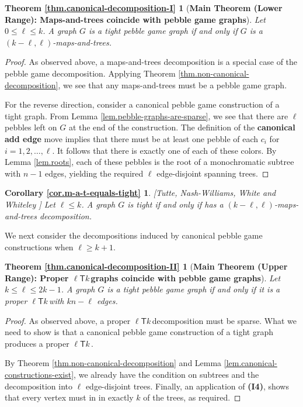 \documentclass[11pt]{article}
\newcommand{\ellteekay}{\ensuremath{\ell{\mathsf T}k}\,}
\newcommand{\reflem}[1]{Lemma \ref{lem.#1}}
\newcommand{\refthm}[1]{Theorem \ref{thm.#1}}
\newcommand{\refcor}[1]{Corollary \ref{cor.#1}}
\newcommand{\restateenv}{ZZZ}
\newenvironment{restate}[1]{
  \renewcommand{\restateenv}{restate.#1}
  \newtheorem*{\restateenv}{\refthm{#1}}
  \begin{\restateenv}
}{\end{\restateenv}}
\newenvironment{restatecor}[1]{
  \renewcommand{\restateenv}{restate.#1}
  \newtheorem*{\restateenv}{\refcor{#1}}
  \begin{\restateenv}
}{\end{\restateenv}}
\begin{document}
	\begin{restate}{canonical-decomposition-I}[{\bf Main Theorem (Lower Range): Maps-and-trees coincide with pebble game graphs}]
	Let $0\le \ell\le k$. A graph $G$ is a tight pebble game graph if and only if $G$ is a $(k-\ell,\ell)$-maps-and-trees.
	\end{restate}
	\begin{proof}
		As observed above, a maps-and-trees decomposition is a special case of the pebble 
		game decomposition.  Applying \refthm{non-canonical-decomposition}, we see that
		any maps-and-trees must be a pebble game graph.
		
		For the reverse direction, consider a canonical pebble game construction of a tight graph. 
		From \reflem{pebble-graphs-are-sparse}, we see that there are $\ell$ pebbles left on 
		$G$ at the end of the construction.
		The definition of the {\bf canonical add edge} move 
		implies that there must be at least one pebble of 
		each $c_i$ for $i=1,2,\ldots,\ell$.  It follows that there is exactly one of each of these 
		colors.  By \reflem{roots}, each of these pebbles is the root of a monochromatic subtree
		with $n-1$ edges, yielding the required $\ell$ edge-disjoint spanning trees.
	\end{proof}
	\begin{restatecor}{m-a-t-equals-tight}
		[Tutte, Nash-Williams, White and Whiteley \cite{tutte61,Na61,whiteley:matroids}] 
		Let $\ell\le k$. A graph $G$ is tight if and only if has a $(k-\ell,\ell)$-maps-and-trees decomposition.
	\end{restatecor}
	
	We next consider the decompositions induced by canonical pebble game 
	constructions when $\ell\ge k+1$. 
	\begin{restate}{canonical-decomposition-II}[{\bf Main Theorem (Upper Range): Proper \ellteekay graphs coincide with pebble game graphs}]
		Let $k\le \ell\le 2k-1$. A graph $G$ is a tight pebble game graph if and only if it is a proper \ellteekay with $kn-\ell$ edges. 
	\end{restate}
	\begin{proof}
		As observed above, a proper \ellteekay decomposition must be sparse.  
		What we need to show is that a canonical pebble game construction of a tight 
		graph produces a proper \ellteekay.
		
		By \refthm{non-canonical-decomposition} and \reflem{canonical-constructions-exist}, 
		we already have the condition on subtrees and the decomposition into $\ell$ edge-disjoint
		trees.  Finally, an application of {\bf (I4)}, shows that every vertex must in in 
		exactly $k$ of the trees, as required.
	\end{proof}
	
\end{document}
